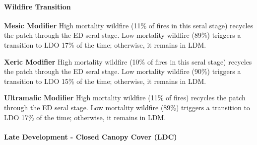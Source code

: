 \paragraph{Wildfire Transition}
\begin{adjustwidth}{2cm}{}
\textbf{Mesic Modifier } High mortality wildfire (11\% of fires in this seral stage) recycles the patch through the ED seral stage. Low mortality wildfire (89\%) triggers a transition to LDO 17\% of the time; otherwise, it remains in LDM.

\medskip
\noindent \textbf{Xeric Modifier} High mortality wildfire (10\% of fires in this seral stage) recycles the patch through the ED seral stage. Low mortality wildfire (90\%) triggers a transition to LDO 15\% of the time; otherwise, it remains in LDM.

\medskip
\noindent \textbf{Ultramafic Modifier}  High mortality wildfire (11\% of fires) recycles the patch through the ED seral stage. Low mortality wildfire (89\%) triggers a transition to LDO 17\% of the time; otherwise, it remains in LDM.

\end{adjustwidth}
\noindent\hrulefill

\paragraph{Late Development - Closed Canopy Cover (LDC)}

